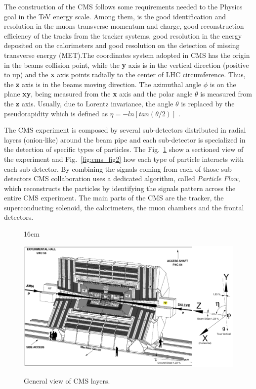 The construction of the CMS follows some requirements needed to the Physics goal in the TeV energy scale. Among them, is the good identification and resolution in the muons transverse momentum and charge, good reconstruction efficiency of the tracks from the tracker systems, good resolution in the energy deposited on the calorimeters and good resolution on the detection of missing transverse energy (MET).The coordinates system adopted in CMS has the origin in the beams collision point, while the 
\textbf{y} axis is in the vertical direction (positive to up) and the \textbf{x} axis points radially to the center of LHC circumference. Thus, the \textbf{z} axis is in the beams moving direction. The azimuthal angle $\phi$ is on the plane \textbf{xy}, being measured from the \textbf{x} axis and the polar angle $\theta$ is measured from the \textbf{z} axis. Usually, due to Lorentz invariance, the angle $\theta$ is replaced by the pseudorapidity which is defined as $\eta=-ln[tan(\theta/2)]$ \cite{bib:lhc-guide,bib:cms-page}.

The CMS experiment is composed by several sub-detectors distributed in radial layers (onion-like) around the beam pipe and each sub-detector is specialized in the detection of specific types of particles. The Fig.~\ref{fig:cms_fig1} show a sectioned view of the experiment and Fig.~\ref{fig:cms_fig2} how each type of particle interacts with each sub-detector. By combining the signals coming from each of those sub-detectors CMS collaboration uses a dedicated algorithm, called \textit{Particle Flow}, which reconstructs the particles by identifying the signals pattern across the entire CMS experiment. The main parts of the CMS are the tracker, the superconducting solenoid, the calorimeters, the muon chambers and the frontal detectors.

\begin{figure}[htbp]{16cm}
\caption{General view of CMS layers.}
\centering
\includegraphics[scale=0.6]{ChapterCMS/figs/cms_coordinates_system.png}
\label{fig:cms_fig1}
\end{figure}

